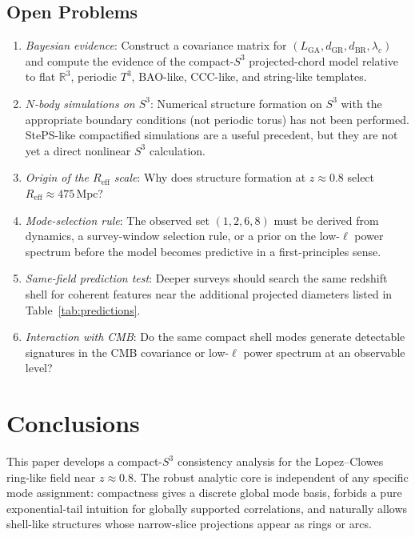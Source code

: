 \documentclass[
  aps,
  prd,
  reprint,
  superscriptaddress,
  nofootinbib,
  longbibliography,
  floatfix,
  amsmath,
  amssymb
]{revtex4-2}
\theoremstyle{plain}
\theoremstyle{definition}
\theoremstyle{remark}
\newcommand{\Sthree}{S^3}
\newcommand{\Reff}{R_{\mathrm{eff}}}
\begin{document}
\subsection{Open Problems}

\begin{enumerate}[label=(\arabic*),noitemsep]
\item \textit{Bayesian evidence}: Construct a covariance matrix for
  $(L_{\mathrm{GA}},d_{\mathrm{GR}},d_{\mathrm{BR}},\lambda_c)$ and compute
  the evidence of the compact-$S^3$ projected-chord model relative to
  flat $\mathbb R^3$, periodic $T^3$, BAO-like, CCC-like, and string-like
  templates.
\item \textit{$N$-body simulations on $\Sthree$}: Numerical structure
  formation on $\Sthree$ with the appropriate boundary conditions
  (not periodic torus) has not been performed. StePS-like compactified
  simulations are a useful precedent, but they are not yet a direct
  nonlinear $S^3$ calculation.
\item \textit{Origin of the $\Reff$ scale}: Why does structure
  formation at $z\approx 0.8$ select $\Reff\approx 475\,\mathrm{Mpc}$?
\item \textit{Mode-selection rule}: The observed set $(1,2,6,8)$ must be
  derived from dynamics, a survey-window selection rule, or a prior on
  the low-$\ell$ power spectrum before the model becomes predictive in a
  first-principles sense.
\item \textit{Same-field prediction test}: Deeper surveys should search
  the same redshift shell for coherent features near the additional
  projected diameters listed in Table~\ref{tab:predictions}.
\item \textit{Interaction with CMB}: Do the same compact shell modes
  generate detectable signatures in the CMB covariance or low-$\ell$
  power spectrum at an observable level?
\end{enumerate}

\section{Conclusions}
\label{sec:conclusions}

This paper develops a compact-$S^3$ consistency analysis for the
Lopez--Clowes ring-like field near $z\approx 0.8$. The robust analytic
core is independent of any specific mode assignment: compactness gives a
discrete global mode basis, forbids a pure exponential-tail intuition
for globally supported correlations, and naturally allows shell-like
structures whose narrow-slice projections appear as rings or arcs.
\end{document}
